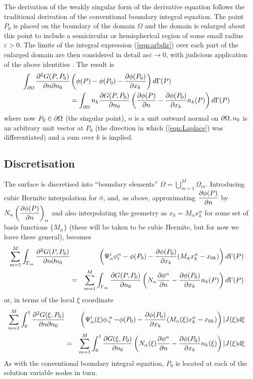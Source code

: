The derivation of the weakly singular form of the derivative equation follows
the traditional derivation of the conventional boundary integral equation.
The point $P_{0}$ is placed on the boundary of the domain $\Omega$ and the
domain is enlarged about this point to include a semicircular or hemispherical
region of some small radius $\varepsilon > 0$.  The limits of the integral
expression (\ref{eqn:arbdir}) over each part of the enlarged domain are then
considered in detail as$\varepsilon \rightarrow 0$, with judicious application
of the above identities \citep{tomlinson:1996,liu:1991}.  The result is
\begin{eqnarray}
 \int_{\partial\Omega}\frac{\partial^{2}G(P,P_{0})}{\partial n\partial n_{0}}
  &\left(\phi(P)-\phi(P_{0})- \dfrac{\partial \phi(P_{0})}{\partial x_{k}} \right)
  d\Gamma(P)\nonumber\\
  &=\int_{\partial\Omega} n_{k} \dfrac{\partial G(P,P_{0})}{\partial n_{0}} \left(
   \dfrac{\partial \phi(P)}{\partial n} - \dfrac{\partial \phi(P_{0})}{\partial x_{k}} n_{k}(P)\right)
  d\Gamma(P)
 \label{eqn:result}
\end{eqnarray}
where now $P_{0}\in \partial\Omega$ (the singular point), $n$ is a unit outward
normal on $\partial\Omega, n_{0}$ is an arbitrary unit vector at $P_{0}$ (the
direction in which (\ref{eqn:Laplace}) was differentiated) and a sum over $k$
is implied.

\subsection{Discretisation}
The surface is discretised into ``boundary elements'' \ie $\Omega =
\displaystyle{\bigcup_{m=1}^{M}}\Omega_{m}$.  Introducing cubic Hermite
interpolation for $\phi $, and, as above, approximating $ \dfrac{\partial \phi(P)}{\partial n} $
by $N_{\alpha}\left( \dfrac{\partial \phi(P)}{\partial n} \right)_{\alpha}$ and also interpolating
the geometry as $x_{k} = M_{\alpha} x_{k}^{\alpha}$ for some set of basis
functions $\{M_{\alpha}\}$ (these will be taken to be cubic Hermite, but for
now we leave these general),  becomes
\begin{eqnarray}
  \sum_{m=1}^{M}\int_{\Gamma_{m}}\frac{\partial^{2}G(P,P_{0})} {\partial n\partial n_{0}}
  &&\left(\Psi_{\alpha}^{i}\phi_{i}^{\alpha}-\phi(P_{0})
    - \dfrac{\partial \phi(P_{0})}{\partial x_{k}} (M_{\alpha}x_{k}^{\alpha} - x_{0k})
  \right)d\Gamma(P)\nonumber\\ 
  &=&\sum_{m=1}^{M}\int_{\Gamma_{m}} \dfrac{\partial G(P,P_{0})}{\partial n_{0}} \left(
    N_{\alpha} \dfrac{\partial \phi^{\alpha}}{\partial n} - \dfrac{\partial \phi(P_{0})}{\partial x_{k}} 
    n_{k}(P)\right)d\Gamma(P)
 \label{eqn:result2}
\end{eqnarray}
or, in terms of the local $\xi$ coordinate
\begin{eqnarray}
 \sum_{m=1}^{M}\int_{0}^{1}\frac{\partial^{2}G(\xi,P_{0})}
  {\partial n\partial n_{0}}
  &&\left(\Psi_{\alpha}^{i}(\xi)\phi,_{i}^{\alpha}-\phi(P_{0})
  - \dfrac{\partial \phi(P_{0})}{\partial x_{k}} (M_{\alpha}(\xi)x_{k}^{\alpha} - x_{0k})
  \right)|J(\xi)d\xi\nonumber\\
 &=&\sum_{m=1}^{M}\int_{0}^{1} \dfrac{\partial G(\xi,P_{0})}{\partial n_{0}} \left(
  N_{\alpha}(\xi) \dfrac{\partial \phi^{\alpha}}{\partial n} 
  - \dfrac{\partial \phi(P_{0})}{\partial x_{k}} n_{k}(\xi)
  \right)|J(\xi)d\xi
 \label{eqn:result3}
\end{eqnarray}
As with the conventional boundary integral equation, $P_{0}$ is located at
each of the solution variable nodes in turn.


